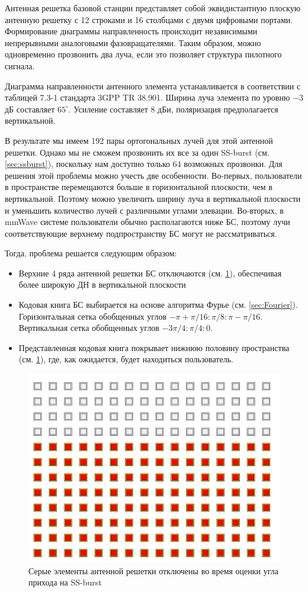 Антенная решетка базовой станции представляет собой эквидистантную плоскую
антенную решетку с 12 строками и 16 столбцами с двумя цифровыми портами.
Формирование диаграммы направленность происходит независимыми непрерывными
аналоговыми фазовращателями. Таким образом, можно одновременно прозвонить два
луча, если это позволяет структура пилотного сигнала.

Диаграмма направленности антенного элемента устанавливается в соответствии с
таблицей 7.3-1 стандарта 3GPP TR 38.901. Ширина луча элемента по уровню $-3$ дБ
составляет $65^\circ$. Усиление составляет 8 дБи, поляризация предполагается вертикальной.

В результате мы имеем 192 пары ортогональных лучей для этой антенной решетки.
Однако мы не сможем прозвонить их все за один SS-burst (см. \ref{sec:ssburst}),
поскольку нам доступно только 64 возможных прозвонки. Для решения этой проблемы
можно учесть две особенности.  Во-первых, пользователи в пространстве перемещаются больше в
горизонтальной плоскости, чем в вертикальной. Поэтому можно увеличить ширину
луча в вертикальной плоскости и уменьшить количество лучей с различными углами
элевации.  Во-вторых, в mmWave системе пользователи обычно располагаются ниже
БС, поэтому лучи соответствующие верхнему подпространству БС могут не
рассматриваться.

Тогда, проблема решается следующим образом:
\begin{itemize}
    \item Верхние 4 ряда антенной решетки БС отключаются (см. \ref{fig:4.6}), обеспечивая более широкую ДН в вертикальной плоскости
    \item Кодовая книга БС выбирается на основе алгоритма Фурье (см.
    \ref{sec:Fourier}). Горизонтальная сетка обобщенных углов $-\pi +
    \pi/16:\pi/8:\pi-\pi/16$.
          Вертикальная сетка обобщенных углов $-3\pi/4:\pi/4:0$.
    \item Представленная кодовая книга покрывает нижнюю половину пространства (см. \ref{fig:4.6}), где, как ожидается, будет находиться пользователь.
\end{itemize}

\begin{figure}[h!]
    \centering
    \includegraphics[width=0.35\linewidth]{figs/fig4.5.png}
    \caption{Серые элементы антенной решетки отключены во время оценки угла прихода на SS-burst}
    \label{fig:4.6}
\end{figure}

